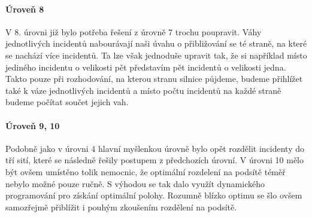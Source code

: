 \documentclass[12pt,a4paper]{article}
\begin{document}
\paragraph*{Úroveň 8}
V 8. úrovni již bylo potřeba řešení z úrovně 7 trochu poupravit. Váhy jednotlivých incidentů nabourávají naši úvahu o přibližování se té straně, na které se nachází více incidentů.
Ta lze však jednoduše upravit tak, že si například místo jediného incidentu o velikosti pět představím pět incidentů o velikosti jedna. Takto pouze při rozhodování, na kterou stranu silnice půjdeme, budeme přihlížet také k váze jednotlivých incidentů a místo počtu incidentů na každé straně budeme počítat součet jejich vah.

\paragraph*{Úroveň 9, 10}
Podobně jako v úrovni 4 hlavní myšlenkou úrovně bylo opět rozdělit incidenty do tří sití, které se následně řešily postupem z předchozích úrovní. V úrovni 10 mělo být ovšem umístěno tolik nemocnic, že optimální rozdelení na podsítě téměř nebylo možné pouze ručně. S výhodou se tak dalo využít dynamického programování pro získání optimální polohy. Rozumně blízko optimu se šlo ovšem samozřejmě přiblížit i pouhým zkoušením rozdělení na podsítě.
\end{document}
